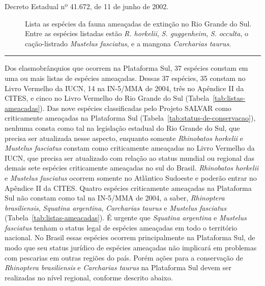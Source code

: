 \documentclass[a4paper,11pt,twoside,showtrims,onecolumn,openright,final]{memoir}
\begin{document}
\begin{table}
\begin{small}
\begin{description}
\item[Decreto Estadual nº 41.672, de 11 de junho de 2002.] Lista as espécies da fauna ameaçadas de extinção no Rio Grande do Sul.
                              Entre as espécies listadas estão \emph{R. horkelii}, 
			      \emph{S. guggenheim}, \emph{S. occulta}, o cação-listrado \emph{Mustelus fasciatus}, e
			      a mangona \emph{Carcharias taurus}.

\end{description}
\end{small}
\rule{\textwidth}{\normalrulethickness}
\end{table}


Dos elasmobrânquios que ocorrem na Plataforma Sul, 37 espécies 
constam em uma ou mais listas de espécies ameaçadas. %
Dessas 37 espécies, 35 constam no Livro Vermelho da IUCN, 14 na IN-5/MMA de 2004, 
três no Apêndice II da CITES, e cinco no Livro Vermelho do Rio Grande do Sul (Tabela~\ref{tab:listas-ameacadas}). %
Das nove espécies classificadas pelo Projeto SALVAR como 
criticamente ameaçadas na Plataforma Sul (Tabela~\ref{tab:status-de-conservacao}), %
nenhuma consta como tal na legislação estadual do Rio Grande do Sul, 
que precisa ser atualizada nesse aspecto, enquanto somente \emph{Rhinobatos horkelii}
e \emph{Mustelus fasciatus} constam como criticamente ameaçadas no Livro Vermelho da IUCN, 
que precisa ser atualizado com relação ao status mundial ou regional das demais sete 
espécies criticamente ameaçadas no sul do Brasil. \emph{Rhinobatos horkelii} e \emph{Mustelus fasciatus}
ocorrem somente no Atlântico Sudoeste e poderão entrar no Apêndice II da CITES.  
Quatro espécies criticamente ameaçadas na Plataforma Sul não constam como tal na IN-5/MMA de 2004, 
a saber, \emph{Rhinoptera brasiliensis}, \emph{Squatina argentina}, \emph{Carcharias taurus}
e \emph{Mustelus fasciatus} (Tabela~\ref{tab:listas-ameacadas}). %
É  urgente que \emph{Squatina argentina} e \emph{Mustelus fasciatus} tenham o status legal 
de espécies ameaçadas em todo o território nacional. No Brasil essas espécies ocorrem 
principalmente na Plataforma Sul, de modo que seu status jurídico de espécies ameaçadas 
não implicará em problemas com pescarias em outras regiões do país. 
Porém ações para a  conservação de \emph{Rhinoptera brasiliensis} e \emph{Carcharias taurus}
na Plataforma Sul devem ser realizadas no nível regional, conforme descrito abaixo. 

\end{document}
